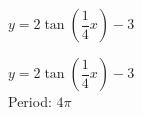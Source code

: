 {$y = 2\tan \left( \dfrac{1}{4}x \right) - 3$}
{$y = 2\tan \left( \dfrac{1}{4}x \right) - 3$\\
Period: $4\pi$

\begin{center}
\end{center}
}
